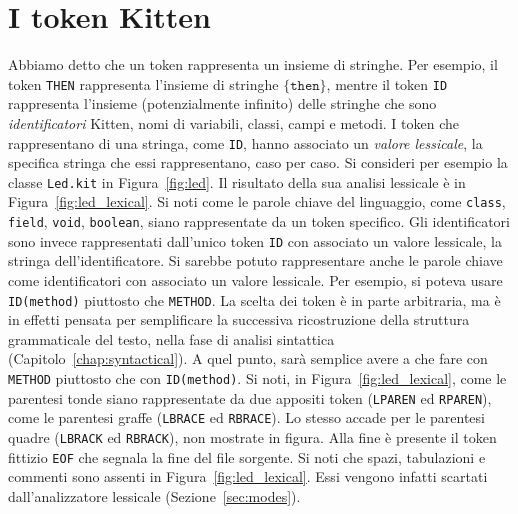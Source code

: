 \section{I token Kitten}\label{sec:token_kitten}
%
Abbiamo detto che un token rappresenta un insieme di stringhe. Per esempio,
il token \texttt{THEN} rappresenta l'insieme
di stringhe $\{\mathtt{then}\}$, mentre
il token \texttt{ID} rappresenta l'insieme (potenzialmente infinito) delle
stringhe che sono
\emph{identificatori} Kitten, \cioe nomi di variabili, classi, campi
e metodi. I token che rappresentano \piu di una stringa, come
\texttt{ID}, hanno associato un \emph{valore lessicale}, \cioe
la specifica stringa che essi rappresentano, caso per caso. Si consideri
per esempio la classe \texttt{Led.kit} in Figura~\ref{fig:led}. Il risultato
della sua analisi lessicale \`e in Figura~\ref{fig:led_lexical}.
Si noti come le parole chiave del linguaggio, come \texttt{class},
\texttt{field}, \texttt{void}, \texttt{boolean}, siano rappresentate
da un token specifico. Gli identificatori sono invece rappresentati
dall'unico token \texttt{ID} con associato un valore lessicale, \cioe
la stringa dell'identificatore. Si sarebbe potuto rappresentare anche
le parole chiave come identificatori con associato un valore lessicale.
Per esempio, si poteva usare \texttt{ID(method)} piuttosto che \texttt{METHOD}.
La scelta dei token \`e in parte arbitraria, ma \`e in effetti pensata
per semplificare la successiva ricostruzione della struttura grammaticale
del testo, nella fase di analisi sintattica (Capitolo~\ref{chap:syntactical}).
A quel punto, sar\`a \piu
semplice avere a che fare con \texttt{METHOD} piuttosto che con
\texttt{ID(method)}. Si noti, in Figura~\ref{fig:led_lexical}, come le
parentesi tonde siano rappresentate da due appositi token
(\texttt{LPAREN} ed \texttt{RPAREN}), \cosi come le parentesi
graffe (\texttt{LBRACE} ed \texttt{RBRACE}). Lo stesso accade per le
parentesi quadre (\texttt{LBRACK} ed \texttt{RBRACK}), non mostrate in figura.
Alla fine \`e presente il token fittizio \texttt{EOF} che segnala la fine
del file sorgente. Si noti che spazi, tabulazioni e commenti sono
assenti in Figura~\ref{fig:led_lexical}. Essi vengono infatti scartati
dall'analizzatore lessicale (Sezione~\ref{sec:modes}).

